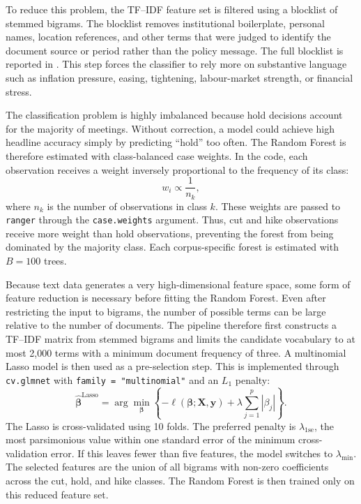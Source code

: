 To reduce this problem, the TF--IDF feature set is filtered using a
blocklist of stemmed bigrams. The blocklist removes institutional
boilerplate, personal names, location references, and other terms that
were judged to identify the document source or period rather than the
policy message. The full blocklist is reported in
. This step forces the classifier to rely more on
substantive language such as inflation pressure, easing, tightening,
labour-market strength, or financial stress.

The classification problem is highly imbalanced because hold decisions
account for the majority of meetings. Without correction, a model could
achieve high headline accuracy simply by predicting ``hold'' too often.
The Random Forest is therefore estimated with class-balanced case
weights. In the code, each observation receives a weight inversely
proportional to the frequency of its class:
%
\begin{equation}
w_i \propto \frac{1}{n_k},
\end{equation}
%
where \(n_k\) is the number of observations in class \(k\). These weights
are passed to \texttt{ranger} through the \texttt{case.weights} argument.
Thus, cut and hike observations receive more weight than hold
observations, preventing the forest from being dominated by the majority
class. Each corpus-specific forest is estimated with \(B=100\) trees.

Because text data generates a very high-dimensional feature space, some
form of feature reduction is necessary before fitting the Random Forest.
Even after restricting the input to bigrams, the number of possible terms
can be large relative to the number of documents. The pipeline therefore
first constructs a TF--IDF matrix from stemmed bigrams and limits the
candidate vocabulary to at most 2{,}000 terms with a minimum document
frequency of three. A multinomial Lasso model is then used as a
pre-selection step. This is implemented through \texttt{cv.glmnet} with
\texttt{family = "multinomial"} and an \(L_1\) penalty:
%
\begin{equation}
\label{eq:lasso}
\hat{\boldsymbol{\beta}}^{\text{Lasso}}
=
\arg\min_{\boldsymbol{\beta}}
\left\{
-\ell(\boldsymbol{\beta}; \mathbf{X}, \mathbf{y})
+
\lambda \sum_{j=1}^{p} |\beta_j|
\right\}.
\end{equation}
%
The Lasso is cross-validated using 10 folds. The preferred penalty is
\(\lambda_{\text{1se}}\), the most parsimonious value within one standard
error of the minimum cross-validation error. If this leaves fewer than
five features, the model switches to \(\lambda_{\min}\). The selected
features are the union of all bigrams with non-zero coefficients across
the cut, hold, and hike classes. The Random Forest is then trained only
on this reduced feature set.

